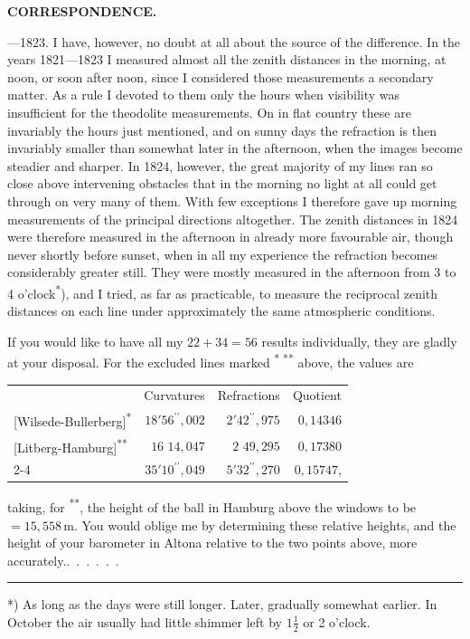 \par\clearpage
\noindent{}\hfill{\small\textbf{CORRESPONDENCE.}}\hfill\null\par\medskip
{}---1823. I have, however, no doubt at all about the source of the difference.
In the years 1821---1823 I measured almost all the zenith distances in the morning,
at noon, or soon after noon, since I considered those measurements a secondary matter.
As a rule I devoted to them only the hours when visibility was insufficient for the
theodolite measurements. On  in flat country these are invariably
the hours just mentioned, and on sunny days the refraction is then invariably smaller
than somewhat later in the afternoon, when the images become steadier and sharper.
In 1824, however, the great majority of my lines ran so close above intervening
obstacles that in the morning no light at all could get through on very many of
them. With few exceptions I therefore gave up morning measurements of the principal
directions altogether. The zenith distances in 1824 were therefore 
measured in the afternoon in already more favourable air, though never shortly before
sunset, when in all my experience the refraction becomes considerably greater still.
They were mostly measured in the afternoon from 3 to 4 o'clock\textsuperscript{*}), and I
tried, as far as practicable, to measure the reciprocal zenith distances on each
line under approximately the same atmospheric conditions.
\par\noindent\hspace*{\parindent}If you would like to have all my \(22+34=56\) results individually, they are gladly
at your disposal. For the excluded lines marked \textsuperscript{* **} above, the values are
\begin{center}
\setlength{\tabcolsep}{4pt}
\begin{tabular}{lrrr}
& Curvatures & Refractions & Quotient\\
{}[Wilsede-Bullerberg]\textsuperscript{*} &\(18'56^{\prime\prime}{,}002\)&\(2'42^{\prime\prime}{,}975\)&\(0{,}14346\)\\
{}[Litberg-Hamburg]\textsuperscript{**} &\(16\phantom{' }14{,}047\)&\(2\phantom{' }49{,}295\)&\(0{,}17380\)\\\cline{2-4}
\multicolumn{1}{r}{Total}&\(35'10^{\prime\prime}{,}049\)&\(5'32^{\prime\prime}{,}270\)&\(0{,}15747\),
\end{tabular}
\end{center}
\noindent taking, for \textsuperscript{**}, the height of the ball in Hamburg above the windows
to be \(=15{,}558\,\mathrm{m}\). You would oblige me by determining these relative heights,
and the height of your barometer in Altona relative to the two points above,
more accurately.\quad\mbox{.\ .\ .\ .\ .\ .}
\par\medskip\noindent\rule{.25\linewidth}{.4pt}\par
{\small\noindent\hspace*{\parindent}*) As long as the days were still longer. Later, gradually somewhat earlier.
In October the air usually had little shimmer left by \(1\frac{1}{2}\) or 2 o'clock.\par}
